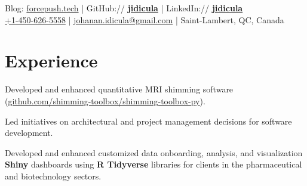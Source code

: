 \documentclass[]{jidicula-resume}
\begin{document}
\lastupdated


{ Blog: \href{http://bit.ly/jidicula-site}{forcepush.tech}
  | GitHub:// \href{http://bit.ly/jidicula_github}{\bf jidicula} | LinkedIn:// \href{https://bit.ly/jidicula-linkedin}{\bf jidicula} \\
  \href{tel:14506265558}{+1-450-626-5558}
  | \href{mailto:johanan.idicula+resume@gmail.com}{johanan.idicula@gmail.com}
  | Saint-Lambert, QC, Canada}

\section{Experience}

\vspace{\topsep} %
\begin{tightemize}
\item Developed and enhanced quantitative MRI shimming software (\href{http://bit.ly/ji-shimming-toolbox}{github.com/shimming-toolbox/shimming-toolbox-py}).
\item Led initiatives on architectural and project management decisions for software development.
\end{tightemize}
\sectionsep

\vspace{\topsep} %
\begin{tightemize}
\item Developed and enhanced customized data onboarding, analysis, and
  visualization \textbf{Shiny} dashboards using \textbf{R Tidyverse} libraries
  for clients in the pharmaceutical and biotechnology sectors.
\end{tightemize}
\sectionsep
\end{document}
